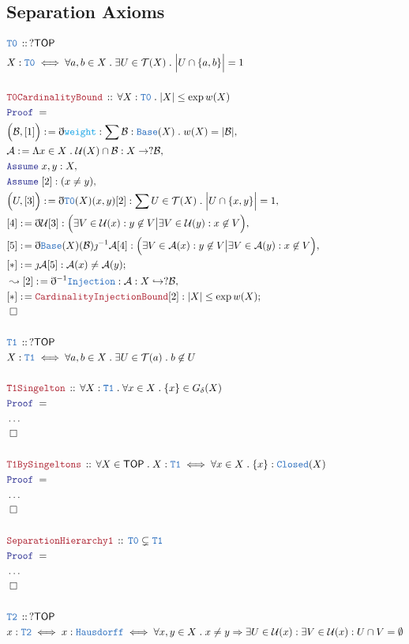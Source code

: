 \documentclass[12pt]{scrartcl}
\newcommand{\TYPE}[1]{\textcolor{NavyBlue}{\mathtt{#1}}}
\newcommand{\FUNC}[1]{\textcolor{Cerulean}{\mathtt{#1}}}
\newcommand{\LOGIC}[1]{\textcolor{Blue}{\mathtt{#1}}}
\newcommand{\THM}[1]{\textcolor{Maroon}{\mathtt{#1}}}
\renewcommand{\.}{\; . \;}
\newcommand{\de}{: \kern 0.1pc =}
\newcommand{\Theorem}[2]{& \THM{#1} \, :: \, #2 \\ & \Proof = \\ }
\newcommand{\DeclareType}[2]{& \TYPE{#1} \, :: \, #2 \\}
\newcommand{\DefineType}[3]{& #1 : \TYPE{#2} \iff #3 \\}
\newcommand{\DefineNamedType}[4]{& #1 : \TYPE{#2} \iff #3 \iff #4 \\}
\newcommand{\Page}[1]{ \begin{align*} #1 \end{align*}   }
\newcommand{ \bd }{ \ByDef }
\newcommand{\NoProof}{ & \ldots \\ \EndProof}
\newcommand{\Imply}{\Rightarrow}
\newcommand{\ToInj}{\hookrightarrow}
\newcommand{\Say}[3]{& #1 \de #2 : #3, \\}
\newcommand{\Conclude}[3]{& #1 \de #2 : #3; \\}
\newcommand{\Derive}[3]{& \leadsto #1 \de #2 : #3, \\}
\newcommand{\Assume}[2]{& \LOGIC{Assume} \; #1 : #2, \\}
\newcommand{\QED}{\; \square}
\newcommand{\EndProof}{& \QED \\}
\newcommand{\ByDef}{\eth}
\newcommand{\ByConstr}{\jmath}
\newcommand{\Proof}{\LOGIC{Proof} \; }
\newcommand{\A}{\mathcal{A}}
\newcommand{\B}{\mathcal{B}}
\newcommand{\TOP}{\mathsf{TOP}}
\newcommand{\T}{\mathcal{T}}
\newcommand{\U}{\mathcal{U}}
\begin{document}
\subsection{Separation Axioms}
\Page{
	\DeclareType{T0}{?\TOP}
	\DefineType{X}{T0}
	{
		\forall a,b \in X \. \exists U \in \T(X) \.
		\Big|U \cap \{a, b \}\Big| = 1 
	}
	\\
	\Theorem{T0CardinalityBound}
	{
		\forall X : \TYPE{T0} \.
		|X| \le \exp w(X)
	}
	\Say{\Big(\B,[1]\Big)}
	{
		\bd \FUNC{weight}
	}
	{
		\sum \B : \TYPE{Base}(X) \. w(X) = |\B|
	}
	\Say{\A}{\Lambda x \in X \. \U(X) \cap \B}
	{
		X \to ?\B
	}
	\Assume{x,y}{X}
	\Assume{[2]}{(x \neq y)}
	\Say{\Big(U,[3]\Big)}
	{
		\bd \TYPE{T0}(X)(x,y)[2]
	}
	{
		\sum U \in \T(X) \. \Big|U \cap \{x,y\}\Big| =  1
	}
	\Say{[4]}{\bd \U [3]}
	{
		\Big( \exists V  \in \U(x) : y \not \in V \big|
		\exists V  \in \U(y) : x \not \in V \Big)
	}
	\Say{[5]}{\bd \TYPE{Base}(X)(\B) \ByConstr^{-1} \A [4]}
	{
		\Big( \exists V  \in \A(x) : y \not \in V \big|
		\exists V  \in \A(y) : x \not \in V \Big)
	}
	\Conclude{[*]}{\ByConstr \A [5]}
	{
		\A(x) \neq \A(y)
	}
	\Derive{[2]}{\bd^{-1} \TYPE{Injection}}
	{
		\A : X \ToInj ?\B
	}
	\Conclude{[*]}{\THM{CardinalityInjectionBound}[2]}
	{ 
	  |X| \le  \exp w(X)
	}
	\EndProof
	\\
	\DeclareType{T1}{?\TOP}
	\DefineType{X}{T1}
	{
		\forall a,b \in X \.  \exists U \in \T(a) \.
		b \not \in U 
	}
	\\
	\Theorem{T1Singelton}
	{
		\forall X : \TYPE{T1} \. \forall x \in X \. 
		\{ x \} \in G_\delta(X)
	}
	\NoProof
	\\
	\Theorem{T1BySingeltons}
	{
		\forall X \in \TOP \.
		X : \TYPE{T1} \iff
		\forall x \in X \.
		\{x\} : \TYPE{Closed}(X)
	}
	\NoProof
	\\
	\Theorem{SeparationHierarchy1}
	{
		\TYPE{T0} \subsetneq \TYPE{T1}
	}
	\NoProof
	\\
	\DeclareType{T2}{?\TOP}
	\DefineNamedType{x}{T2}{x : \TYPE{Hausdorff}}
	{
		\forall x,y \in X \.
		x \neq y \Imply 
		\exists U \in \U(x) : 
		\exists V \in \U(x) :
		U \cap V = \emptyset
	}
}
\end{document}
